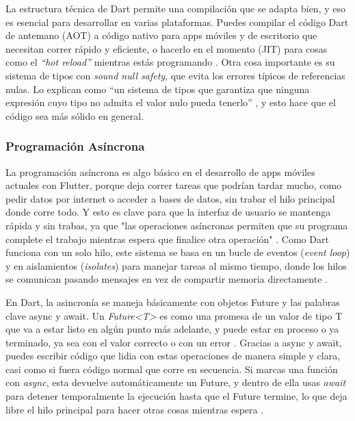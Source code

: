 La estructura técnica de Dart permite una compilación que se adapta bien, y eso es esencial para desarrollar en varias plataformas. Puedes compilar el código Dart de antemano (AOT) a código nativo para apps móviles y de escritorio que necesitan correr rápido y eficiente, o hacerlo en el momento (JIT) para cosas como el \textit{``hot reload''} mientras estás programando \cite{DartEvolution2024}. Otra cosa importante es su sistema de tipos con \textit{sound null safety}, que evita los errores típicos de referencias nulas. Lo explican como “un sistema de tipos que garantiza que ninguna expresión cuyo tipo no admita el valor nulo pueda tenerlo” \cite{DartDocHiberus}, y esto hace que el código sea más sólido en general.

\subsubsection{Programación Asíncrona}

La programación asíncrona es algo básico en el desarrollo de apps móviles actuales con Flutter, porque deja correr tareas que podrían tardar mucho, como pedir datos por internet o acceder a bases de datos, sin trabar el hilo principal donde corre todo. Y esto es clave para que la interfaz de usuario se mantenga rápida y sin trabas, ya que "las operaciones asíncronas permiten que su programa complete el trabajo mientras espera que finalice otra operación" \cite{DartAsyncAwait}. Como Dart funciona con un solo hilo, este sistema se basa en un bucle de eventos (\textit{event loop}) y en aislamientos (\textit{isolates}) para manejar tareas al mismo tiempo, donde los hilos se comunican pasando mensajes en vez de compartir memoria directamente \cite{RedwerkAsyncFlutter}.

En Dart, la asincronía se maneja básicamente con objetos Future y las palabras clave async y await. Un \textit{Future<T>} es como una promesa de un valor de tipo T que va a estar listo en algún punto más adelante, y puede estar en proceso o ya terminado, ya sea con el valor correcto o con un error \cite{DartAsyncLanguage}. Gracias a async y await, puedes escribir código que lidia con estas operaciones de manera simple y clara, casi como si fuera código normal que corre en secuencia. Si marcas una función con \textit{async}, esta devuelve automáticamente un Future, y dentro de ella usas \textit{await} para detener temporalmente la ejecución hasta que el Future termine, lo que deja libre el hilo principal para hacer otras cosas mientras espera \cite{DartAsyncAwait}.


